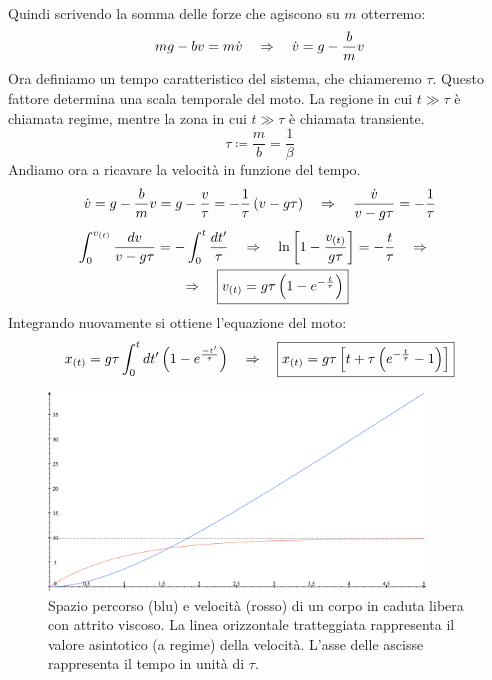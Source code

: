 \\
Quindi scrivendo la somma delle forze che agiscono su $m$ otterremo:
\begin{equation}
    mg - bv = m\dot v \quad\Rightarrow\quad \dot v = g - \frac{b}{m}v
\end{equation}
Ora definiamo un tempo caratteristico del sistema, che chiameremo $\tau$.
Questo fattore determina una scala temporale del moto. La regione in cui
$t\gg\tau$ è chiamata regime, mentre la zona in cui $t\gg\tau$ è chiamata
transiente.
\begin{equation}
    \boxed{\tau \coloneqq \frac{m}{b} = \frac1\beta}
\label{eq:forces:time_constant}
\end{equation}
Andiamo ora a ricavare la velocità in funzione del tempo.
\begin{equation}
    \dot v = g - \frac bmv = g - \frac v\tau = -\frac1\tau\left( v - g\tau\right)
    \quad\Rightarrow\quad \frac{\dot v}{v -g\tau} = -\frac1\tau
\end{equation}
\begin{multline}
   \int_0^{v_{(t)}}\frac{d v}{v -g\tau} = -\int_0^t\frac{dt'}\tau\quad\Rightarrow\quad
   \ln\left[ 1 - \frac{v_{(t)}}{g\tau}\right] = -\frac t\tau\quad\Rightarrow\quad
   \\\quad\Rightarrow\quad\boxed{v_{(t)} = g\tau\left(1-e^{-\frac t\tau}\right)}
\label{eq:forces:viscous_v}
\end{multline}
Integrando nuovamente si ottiene l'equazione del moto:
\begin{equation}
    x_{(t)} = g\tau\int_0^tdt'\left(1-e^{\frac{-t'}\tau}\right) \quad\Rightarrow\quad
    \boxed{x_{(t)} = g\tau\left[ t + \tau\left( e^{-\frac t\tau} - 1\right)\right]}
\label{eq:forces:viscous_x}
\end{equation}
\begin{figure}[htbp]
    \begin{center}
        \includegraphics[width=10cm]{images/cadsmorzxv.png}
        \caption{Spazio percorso (blu) e velocità (rosso) di un corpo in caduta libera con attrito viscoso. La linea orizzontale tratteggiata rappresenta il valore asintotico (a regime) della velocità. L'asse delle ascisse rappresenta il tempo in unità di $\tau$.}
\end{center}
\label{fig:forces:freefall:curves}
\end{figure}
